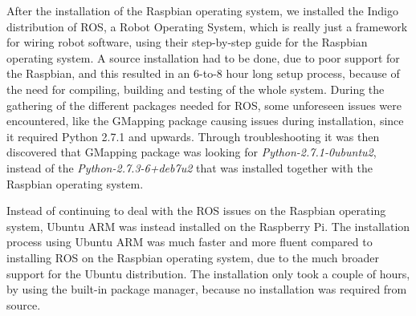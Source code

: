 After the installation of the Raspbian operating system, we installed the Indigo distribution of ROS, a Robot Operating System, which is really just a framework for wiring robot software, using their step-by-step guide for the Raspbian operating system\cite{indigoins}.
A source installation had to be done, due to poor support for the Raspbian, and this resulted in an 6-to-8 hour long setup process, because of the need for compiling, building and testing of the whole system. 
During the gathering of the different packages needed for ROS, some unforeseen issues were encountered, like the GMapping package causing issues during installation, since it required Python 2.7.1 and upwards. Through troubleshooting it was then discovered that GMapping package was looking for \textit{Python-2.7.1-0ubuntu2}, instead of the \textit{Python-2.7.3-6+deb7u2} that was installed together with the Raspbian operating system.

Instead of continuing to deal with the ROS issues on the Raspbian operating system, Ubuntu ARM was instead installed on the Raspberry Pi\cite{ubuntuins}.
The installation process using Ubuntu ARM was much faster and more fluent compared to installing ROS on the Raspbian operating system, due to the much broader support for the Ubuntu distribution. The installation only took a couple of hours, by using the built-in package manager, because no installation was required from source\cite{ubuntuROS}.

